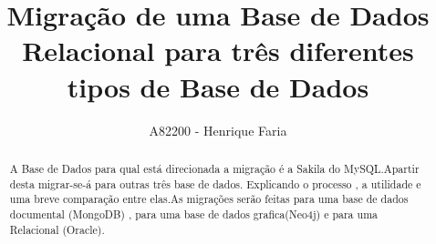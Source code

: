 

\title{Migração de uma Base de Dados Relacional para três diferentes tipos de Base de Dados}

\author{A82200 - Henrique Faria }




\maketitle

\begin{abstract}

A Base de Dados para qual está direcionada a migração é a Sakila do MySQL.Apartir desta migrar-se-á para outras três base de dados. Explicando o processo , a utilidade e uma breve comparação entre elas.As migrações serão feitas para uma base de dados documental (MongoDB) , para uma base de dados grafica(Neo4j) e para uma Relacional (Oracle).

\end{abstract}
\newpage

